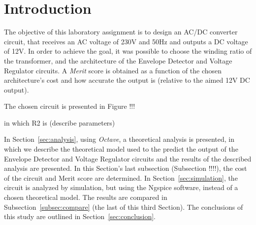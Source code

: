 \section{Introduction}
\label{sec:introduction}

The objective of this laboratory assignment is to design an AC/DC converter circuit, that receives an AC voltage of 230V and 50Hz and outputs a DC voltage of 12V. In order to achieve the goal, it was possible to choose the winding ratio of the transformer, and the architecture of the Envelope Detector and Voltage Regulator circuits. A \textit{Merit} score is obtained as a function of the chosen architecture's cost and how accurate the output is (relative to the aimed 12V DC output). 

The chosen circuit is presented in Figure !!!

in which R2 is (describe parameters)


In Section~\ref{sec:analysis}, using \textit{Octave}, a theoretical analysis is presented, in which we describe the theoretical model used to the predict the output of the Envelope Detector and Voltage Regulator circuits and the results of the described analysis are presented. In this Section's last subsection (Subsection !!!!), the cost of the circuit and Merit score are determined. In Section~\ref{sec:simulation}, the circuit is analyzed by simulation, but using the Ngspice software, instead of a chosen theoretical model. The results are compared in Subsection~\ref{subsec:compare} (the last of this third Section). The conclusions of this study are outlined in Section~\ref{sec:conclusion}.

